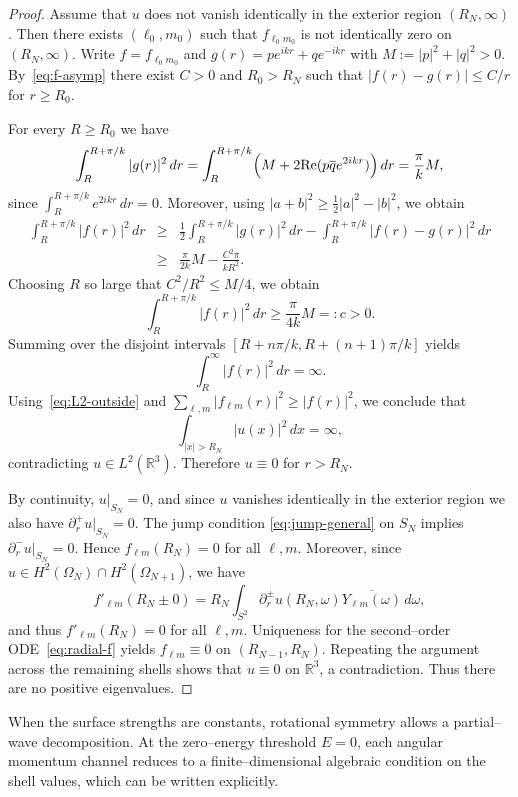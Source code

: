 \documentclass[a4paper,11pt]{article}
\numberwithin{equation}{section}
\renewcommand{\Re}{\text{{\rm Re}}}
\theoremstyle{definition}
\theoremstyle{remark}
\begin{document}
\begin{proof}
Assume that $u$ does not vanish identically in the exterior region $(R_N,\infty)$.
Then there exists $(\ell_0,m_0)$ such that $f_{\ell_0m_0}$ is not identically zero
on $(R_N,\infty)$.
Write $f=f_{\ell_0m_0}$ and $g(r)=p e^{ikr}+q e^{-ikr}$ with
$M:=|p|^2+|q|^2>0$.
By~\eqref{eq:f-asymp} there exist $C>0$ and $R_0>R_N$ such that
$|f(r)-g(r)|\le C/r$ for $r\ge R_0$.

For every $R\ge R_0$ we have
\[
\int_R^{R+\pi/k}|g(r)|^2\,dr
=\int_R^{R+\pi/k}\Bigl(M+2\Re(p\overline{q}e^{2ikr})\Bigr)\,dr
=\frac{\pi}{k}M,
\]
since $\int_R^{R+\pi/k}e^{2ikr}\,dr=0$.
Moreover, using $|a+b|^2\ge \frac12|a|^2-|b|^2$, we obtain
\begin{eqnarray*}
\int_R^{R+\pi/k}|f(r)|^2\,dr
&\ge&
\frac12\int_R^{R+\pi/k}|g(r)|^2\,dr
-\int_R^{R+\pi/k}|f(r)-g(r)|^2\,dr \\
&\ge&
\frac{\pi}{2k}M-\frac{C^2\pi}{kR^2}.
\end{eqnarray*}
Choosing $R$ so large that $C^2/R^2\le M/4$, we obtain
\[
\int_R^{R+\pi/k}|f(r)|^2\,dr\ge \frac{\pi}{4k}M=:c>0.
\]
Summing over the disjoint intervals
$[R+n\pi/k,R+(n+1)\pi/k]$ yields
\[
\int_R^\infty |f(r)|^2\,dr=\infty.
\]
Using~\eqref{eq:L2-outside} and
$\sum_{\ell,m}|f_{\ell m}(r)|^2\ge |f(r)|^2$,
we conclude that
\[
\int_{|x|>R_N}|u(x)|^2\,dx=\infty,
\]
contradicting $u\in L^2(\mathbb R^3)$.
Therefore $u\equiv0$ for $r>R_N$.

By continuity, $u|_{S_N}=0$, and since $u$ vanishes identically in the exterior
region we also have $\partial_r^+u|_{S_N}=0$.
The jump condition \eqref{eq:jump-general} on $S_N$ implies
$\partial_r^-u|_{S_N}=0$.
Hence $f_{\ell m}(R_N)=0$ for all $\ell,m$.
Moreover, since $u\in H^2(\Omega_N)\cap H^2(\Omega_{N+1})$, we have
\[
f'_{\ell m}(R_N\pm 0)
=R_N\int_{S^2}\partial_r^\pm u(R_N,\omega)
\overline{Y_{\ell m}(\omega)}\,d\omega,
\]
and thus $f'_{\ell m}(R_N)=0$ for all $\ell,m$.
Uniqueness for the second--order ODE~\eqref{eq:radial-f} yields
$f_{\ell m}\equiv0$ on $(R_{N-1},R_N)$.
Repeating the argument across the remaining shells shows that
$u\equiv0$ on $\mathbb R^3$, a contradiction.
Thus there are no positive eigenvalues.
\end{proof}

When the surface strengths are constants, rotational symmetry allows a
partial--wave decomposition.
At the zero--energy threshold $E=0$, each angular momentum channel reduces to a
finite--dimensional algebraic condition on the shell values, which can be
written explicitly.
\end{document}

